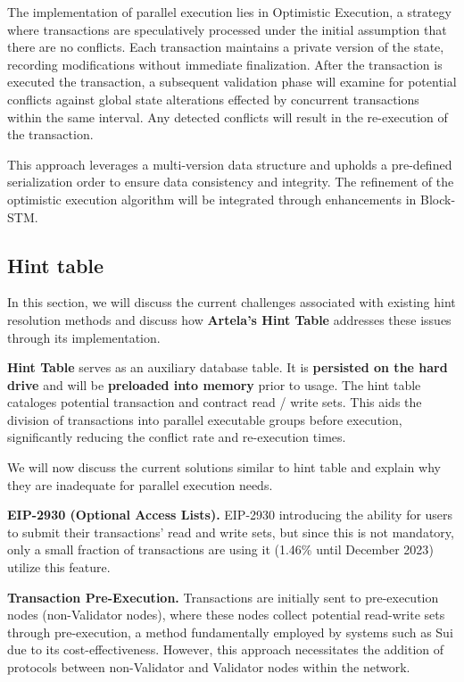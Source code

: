 The implementation of parallel execution lies in Optimistic Execution, a strategy where transactions are speculatively processed under the initial assumption that there are no conflicts. Each transaction maintains a private version of the state, recording modifications without immediate finalization. After the transaction is executed the transaction, a subsequent validation phase will examine for potential conflicts against global state alterations effected by concurrent transactions within the same interval. Any detected conflicts will result in the re-execution of the transaction. 

This approach leverages a multi-version data structure and upholds a pre-defined serialization order to ensure data consistency and integrity. The refinement of the optimistic execution algorithm will be integrated through enhancements in Block-STM\cite{gelashvili2022blockstm}.

\subsection{Hint table}

In this section, we will discuss the current challenges associated with existing hint resolution methods and discuss how \textbf{Artela's Hint Table} addresses these issues through its implementation.

\textbf{Hint Table} serves as an auxiliary database table. It is \textbf{persisted on the hard drive} and will be \textbf{preloaded into memory} prior to usage. The hint table cataloges potential transaction and contract read / write sets. This aids the division of transactions into parallel executable groups before execution, significantly reducing the conflict rate and re-execution times.

We will now discuss the current solutions similar to hint table and explain why they are inadequate for parallel execution needs.

\textbf{EIP-2930 (Optional Access Lists)\cite{buterin2020eip2930}.} EIP-2930 introducing the ability for users to submit their transactions' read and write sets, but since this is not mandatory, only a small fraction of transactions are using it (1.46\% until December 2023\cite{heimbach2023dissecting}) utilize this feature.

\textbf{Transaction Pre-Execution.} Transactions are initially sent to pre-execution nodes (non-Validator nodes), where these nodes collect potential read-write sets through pre-execution, a method fundamentally employed by systems such as Sui due to its cost-effectiveness. However, this approach necessitates the addition of protocols between non-Validator and Validator nodes within the network.

